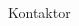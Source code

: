 \documentclass[../_main/handlingar.tex]{subfiles}
\begin{document}

\begin{signatures}{1}
    \mvh
    \signature{\sekr}{Kontaktor}
\end{signatures}
\end{document}
